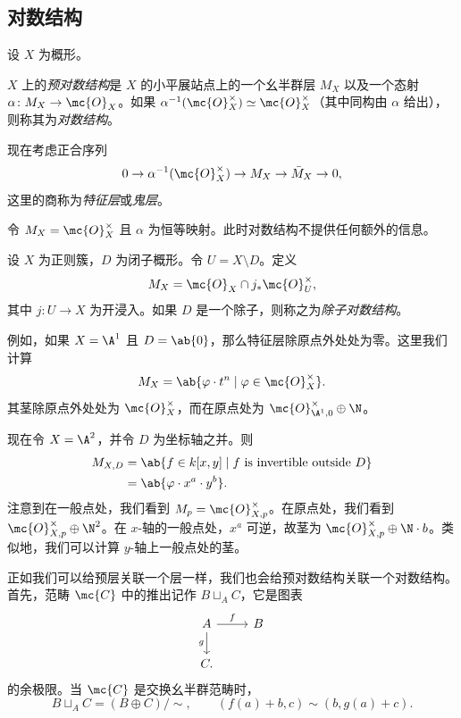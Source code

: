 \subsection{对数结构}%
\label{sub:Log structures}

设 \(X\) 为概形。
\begin{defn}
    \(X\) 上的\textit{预对数结构}是 \(X\) 的小平展站点上的一个幺半群层 \(M_X\) 以及一个态射 \(\alpha \colon M_X \to \mc{O}_X\)。如果 \(\alpha^{-1}(\mc{O}_X^{\times}) \simeq \mc{O}_X^{\times}\)（其中同构由 \(\alpha\) 给出），则称其为\textit{对数结构}。
\end{defn}

现在考虑正合序列
\[ 0 \to \alpha^{-1}(\mc{O}_X^{\times}) \to M_X \to \bar{M}_X \to 0, \]
这里的商称为\textit{特征层}或\textit{鬼层}。

\begin{exm}
    令 \(M_X = \mc{O}_X^{\times}\) 且 \(\alpha\) 为恒等映射。此时对数结构不提供任何额外的信息。
\end{exm}

\begin{exm}
    设 \(X\) 为正则簇，\(D\) 为闭子概形。令 \(U = X \setminus D\)。定义
    \[ M_X = \mc{O}_X \cap j_* \mc{O}_U^{\times}, \]
    其中 \(j \colon U \to X\) 为开浸入。如果 \(D\) 是一个除子，则称之为\textit{除子对数结构}。

    例如，如果 \(X = \A^1\) 且 \(D = \ab\{0\}\)，那么特征层除原点外处处为零。这里我们计算
    \[ M_X = \ab\{ \varphi \cdot t^n \mid \varphi \in \mc{O}_X^{\times} \}. \]
    其茎除原点外处处为 \(\mc{O}_X^{\times}\)，而在原点处为 \(\mc{O}_{\A^1, 0}^{\times} \oplus \N\)。
\end{exm}

\begin{exm}
    现在令 \(X = \A^2\)，并令 \(D\) 为坐标轴之并。则
    \begin{align*}
        M_{X,D} &= \ab\{f \in k[x,y] \mid f \text{ is invertible outside } D \} \\
        &= \ab\{\varphi \cdot x^a \cdot y^b\}.
    \end{align*}
    注意到在一般点处，我们看到 \(M_p = \mc{O}_{X,p}^{\times}\)。在原点处，我们看到 \(\mc{O}_{X,p}^{\times}\oplus \N^2\)。在 \(x\)-轴的一般点处，\(x^a\) 可逆，故茎为 \(\mc{O}_{X,p}^{\times}\oplus \N \cdot b\)。类似地，我们可以计算 \(y\)-轴上一般点处的茎。
\end{exm}

正如我们可以给预层关联一个层一样，我们也会给预对数结构关联一个对数结构。首先，范畴 \(\mc{C}\) 中的推出记作 \(B \sqcup_A C\)，它是图表
\begin{equation*}
\begin{tikzcd}
    A \ar{r}{f} \ar{d}[swap]{g} & B \\
    C.
\end{tikzcd}
\end{equation*}
的余极限。当 \(\mc{C}\) 是交换幺半群范畴时，
\[ B \sqcup_A C = (B \oplus C)/\sim, \qquad (f(a) + b, c) \sim (b, g(a)+c). \]

